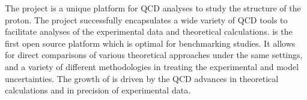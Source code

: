 
\label{sec:summary}
The \fitter project is a unique platform for QCD analyses to study the 
structure of the proton.
The project successfully encapsulates a wide variety
of QCD tools to facilitate analyses of the experimental data
and theoretical calculations. \fitter is the first open source platform which is optimal for benchmarking studies. It allows for direct comparisons of various theoretical approaches under the same settings, and a variety of different methodologies in treating  the experimental and model uncertainties. The growth of \fitter is driven by the QCD advances in theoretical calculations and in precision of experimental data.


